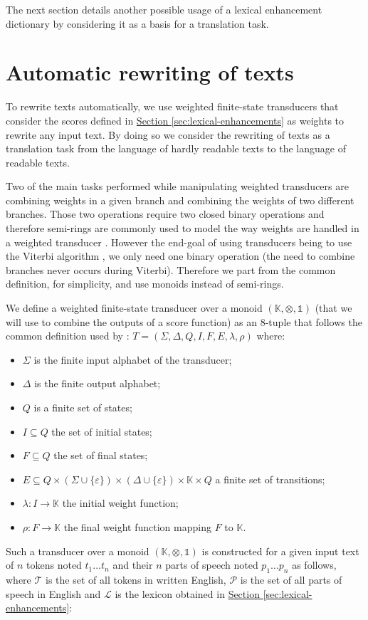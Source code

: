 \documentclass[a4paper, 11pt, onepage]{scrreprt}
\newcommand\sectionref[1]{\hyperref[#1]{Section \ref*{#1}}}
\begin{document}
The next section details another possible usage of a lexical
enhancement dictionary by considering it as a basis for a translation
task.

\section{Automatic rewriting of texts}
\label{sec:rewriting}

To rewrite texts automatically, we use weighted finite-state
transducers that consider the scores defined
in \sectionref{sec:lexical-enhancements} as weights to rewrite any
input text. By doing so we consider the rewriting of texts as a
translation task from the language of hardly readable texts to the
language of readable texts.

Two of the main tasks performed while manipulating weighted
transducers are combining weights in a given branch and combining the
weights of two different branches. Those two operations require two
closed binary operations and therefore semi-rings are commonly used to
model the way weights are handled in a weighted transducer
\cite{mohri2004weighted}. However the end-goal of using transducers
being to use the Viterbi algorithm \cite{forney1973viterbi}, we only
need one binary operation (the need to combine branches never occurs
during Viterbi). Therefore we part from the common definition, for
simplicity, and use monoids instead of semi-rings.

We define a weighted finite-state transducer over a monoid
$(\mathbb{K}, \otimes, \mathbb{1})$ (that we will use to combine the
outputs of a score function) as an 8-tuple that follows the common
definition used by \cite{mohri2004weighted}: $T = (\Sigma, \Delta, Q,
I, F, E, \lambda, \rho)$ where:
\begin{itemize}
\item $\Sigma$ is the finite input alphabet of the transducer;
\item $\Delta$ is the finite output alphabet;
\item $Q$ is a finite set of states;
\item $I \subseteq Q$ the set of initial states;
\item $F \subseteq Q$ the set of final states;
\item $E \subseteq Q \times (\Sigma \cup \{\varepsilon\}) \times
  (\Delta \cup \{\varepsilon\}) \times \mathbb{K} \times Q$ a finite
  set of transitions;
\item $\lambda : I \rightarrow \mathbb{K}$ the initial weight function;
\item $\rho : F \rightarrow \mathbb{K}$ the final weight function mapping
  $F$ to $\mathbb{K}$.
\end{itemize}
Such a transducer over a monoid $(\mathbb{K}, \otimes, \mathbb{1})$ is
constructed for a given input text of $n$ tokens noted $t_1 \dots t_n$
and their $n$ parts of speech noted $p_1 \dots p_n$ as follows, where
$\mathcal{T}$ is the set of all tokens in written English,
$\mathcal{P}$ is the set of all parts of speech in English and
$\mathcal{L}$ is the lexicon obtained
in \sectionref{sec:lexical-enhancements}:
\end{document}
